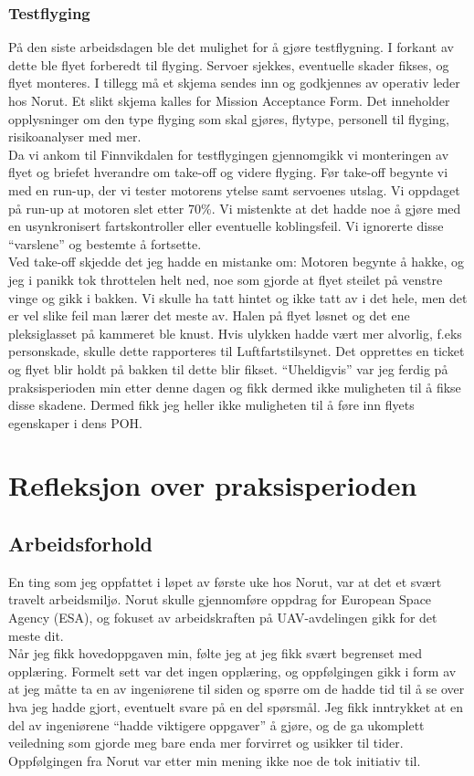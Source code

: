 \documentclass[12pt, a4paper]{article}
\begin{document}
\subsubsection{Testflyging}
På den siste arbeidsdagen ble det mulighet for å gjøre testflygning. I forkant av dette ble flyet forberedt til flyging. Servoer sjekkes, eventuelle skader fikses, og flyet monteres. I tillegg må et skjema sendes inn og godkjennes av operativ leder hos Norut. Et slikt skjema kalles for Mission Acceptance Form. Det inneholder opplysninger om den type flyging som skal gjøres, flytype, personell til flyging, risikoanalyser med mer. \\
Da vi ankom til Finnvikdalen for testflygingen gjennomgikk vi monteringen av flyet og  briefet hverandre om take-off og videre flyging. Før take-off begynte vi med en run-up, der vi tester motorens ytelse samt servoenes utslag. Vi oppdaget på run-up at motoren slet etter 
70\%. Vi mistenkte at det hadde noe å gjøre med en usynkronisert fartskontroller eller eventuelle koblingsfeil. Vi ignorerte disse ``varslene'' og bestemte å fortsette. \\
Ved take-off skjedde det jeg hadde en mistanke om: Motoren begynte å hakke, og jeg i panikk tok throttelen helt ned, noe som gjorde at flyet steilet på venstre vinge og gikk i bakken. Vi skulle ha tatt hintet og ikke tatt av i det hele, men det er vel slike feil man lærer det meste av. Halen på flyet løsnet og det ene pleksiglasset på kammeret ble knust. 
Hvis ulykken hadde vært mer alvorlig, f.eks personskade, skulle dette rapporteres til Luftfartstilsynet. Det opprettes en ticket og flyet blir holdt på bakken til dette blir fikset. ``Uheldigvis'' var jeg ferdig på praksisperioden min etter denne dagen og fikk dermed ikke muligheten til å fikse disse skadene. Dermed fikk jeg heller ikke muligheten til å føre inn flyets egenskaper i dens POH. 

\section{Refleksjon over praksisperioden}
\subsection{Arbeidsforhold}
En ting som jeg oppfattet i løpet av første uke hos Norut, var at det et svært travelt arbeidsmiljø. Norut skulle gjennomføre oppdrag for European Space Agency (ESA), og fokuset av arbeidskraften på UAV-avdelingen gikk for det meste dit.\\
Når jeg fikk hovedoppgaven min, følte jeg at jeg fikk svært begrenset med opplæring. Formelt sett var det ingen opplæring, og oppfølgingen gikk i form av at jeg måtte ta en av ingeniørene til siden og spørre om de hadde tid til å se over hva jeg hadde gjort, eventuelt svare på en del spørsmål. Jeg fikk inntrykket at en del av ingeniørene ``hadde viktigere oppgaver'' å gjøre, og de ga ukomplett veiledning som gjorde meg bare enda mer forvirret og usikker til tider. Oppfølgingen fra Norut var etter min mening ikke noe de tok initiativ til.\\
\end{document}
